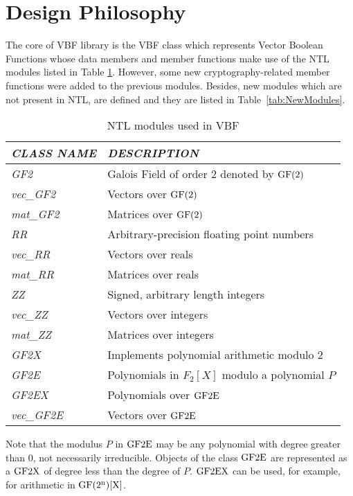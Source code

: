 \section{Design Philosophy}

The core of VBF library is the VBF class which represents Vector Boolean
Functions whose data members and member functions make use of the NTL modules
listed in Table \ref{tab:NTLModules}. However, some new cryptography-related
member functions were added to the previous modules. Besides, new modules which are not present in NTL, are defined and they are listed in Table~\ref{tab:NewModules}.  

\begin{table}[htbp]%
\caption{NTL modules used in VBF\label{tab:NTLModules}}{%
\begin{tabular}{|l|l|}
\hline
\em{CLASS NAME} & \em{DESCRIPTION} \\\hline
\textsl{GF2} & Galois Field of order $2$ denoted by $\gf{GF(2)}$ \\\hline
\textsl{vec\_GF2} & Vectors over $\gf{GF(2)}$ \\\hline
\textsl{mat\_GF2} & Matrices over $\gf{GF(2)}$ \\\hline
\textsl{RR} & Arbitrary-precision floating point numbers \\\hline
\textsl{vec\_RR} & Vectors over reals \\\hline
\textsl{mat\_RR} & Matrices over reals \\\hline
\textsl{ZZ} & Signed, arbitrary length integers \\\hline
\textsl{vec\_ZZ} & Vectors over integers \\\hline
\textsl{mat\_ZZ} & Matrices over integers \\\hline
\textsl{GF2X} & Implements polynomial arithmetic modulo $2$ \\\hline
\textsl{GF2E} & Polynomials in $F_2[X]$ modulo a polynomial $P$ \\\hline
\textsl{GF2EX} & Polynomials over $\gf{GF2E}$ \\\hline
\textsl{vec\_GF2E} & Vectors over $\gf{GF2E}$ \\\hline
\end{tabular}}
\end{table}%

Note that the modulus $P$ in $\gf{GF2E}$ may be any polynomial with degree
greater than $0$, not necessarily irreducible. Objects of the class $\gf{GF2E}$ are
represented as a $\gf{GF2X}$ of degree less than the degree of $P$. $\gf{GF2EX}$
can be used, for example, for arithmetic in $\gf{GF(2^n)[X]}$. 

